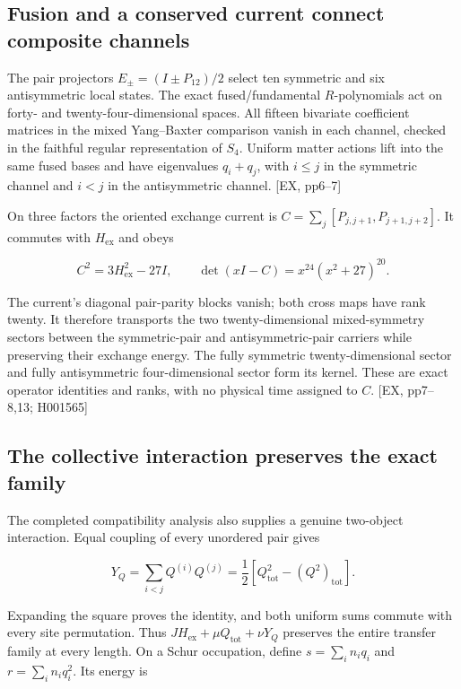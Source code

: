 \subsection{Fusion and a conserved current connect composite channels}\label{fusion-and-a-conserved-current-connect-composite-channels}

The pair projectors \(E_\pm=(I\pm P_{12})/2\) select ten symmetric and six antisymmetric local states. The exact fused/fundamental \(R\)-polynomials act on forty- and twenty-four-dimensional spaces. All fifteen bivariate coefficient matrices in the mixed Yang--Baxter comparison vanish in each channel, checked in the faithful regular representation of \(S_4\). Uniform matter actions lift into the same fused bases and have eigenvalues \(q_i+q_j\), with \(i\le j\) in the symmetric channel and \(i<j\) in the antisymmetric channel. {[}EX, pp6--7{]}

On three factors the oriented exchange current is \(C=\sum_j[P_{j,j+1},P_{j+1,j+2}]\). It commutes with \(H_{\mathrm{ex}}\) and obeys

\[
C^2=3H_{\mathrm{ex}}^2-27I,\qquad\det(xI-C)=x^{24}(x^2+27)^{20}.
\]

The current's diagonal pair-parity blocks vanish; both cross maps have rank twenty. It therefore transports the two twenty-dimensional mixed-symmetry sectors between the symmetric-pair and antisymmetric-pair carriers while preserving their exchange energy. The fully symmetric twenty-dimensional sector and fully antisymmetric four-dimensional sector form its kernel. These are exact operator identities and ranks, with no physical time assigned to \(C\). {[}EX, pp7--8,13; H001565{]}

\subsection{The collective interaction preserves the exact family}\label{the-collective-interaction-preserves-the-exact-family}

The completed compatibility analysis also supplies a genuine two-object interaction. Equal coupling of every unordered pair gives

\[
Y_Q=\sum_{i<j}Q^{(i)}Q^{(j)}=\frac12\left[Q_{\mathrm{tot}}^2-(Q^2)_{\mathrm{tot}}\right].
\]

Expanding the square proves the identity, and both uniform sums commute with every site permutation. Thus \(JH_{\mathrm{ex}}+\mu Q_{\mathrm{tot}}+\nu Y_Q\) preserves the entire transfer family at every length. On a Schur occupation, define \(s=\sum_i n_iq_i\) and \(r=\sum_i n_iq_i^2\). Its energy is

